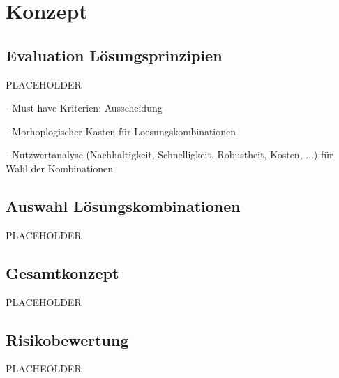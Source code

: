 \section{Konzept}

\subsection{Evaluation Lösungsprinzipien}

PLACEHOLDER

- Must have Kriterien: Ausscheidung

- Morhoplogischer Kasten für Loesungskombinationen

- Nutzwertanalyse (Nachhaltigkeit, Schnelligkeit, Robustheit, Kosten, ...) für Wahl der Kombinationen


\subsection{Auswahl Lösungskombinationen}

PLACEHOLDER

\subsection{Gesamtkonzept}

PLACEHOLDER

\subsection{Risikobewertung}

PLACHEOLDER